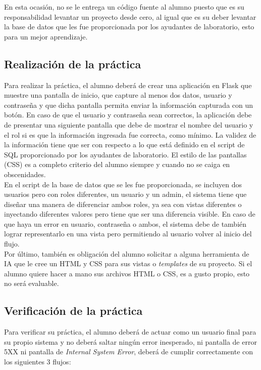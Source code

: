 \documentclass{article}
\begin{document}
En esta ocasión, no se le entrega un código fuente al alumno puesto que es su responsabilidad levantar un proyecto desde cero, al igual que es su deber levantar la base de datos que les fue proporcionada por los ayudantes de laboratorio, esto para un mejor aprendizaje.

\subsection{Realización de la práctica}

Para realizar la práctica, el alumno deberá de crear una aplicación en Flask que muestre una pantalla de inicio, que capture al menos dos datos, usuario y contraseña y que dicha pantalla permita enviar la información capturada con un botón. En caso de que el usuario y contraseña sean correctos, la aplicación debe de presentar una siguiente pantalla que debe de mostrar el nombre del usuario y el rol si es que la información ingresada fue correcta, como mínimo. La validez de la información tiene que ser con respecto a lo que está definido en el script de SQL proporcionado por los ayudantes de laboratorio. El estilo de las pantallas (CSS) es a completo criterio del alumno siempre y cuando no se caiga en obscenidades.\\

En el script de la base de datos que se les fue proporcionada, se incluyen dos usuarios pero con roles diferentes, un usuario y un admin, el sistema tiene que diseñar una manera de diferenciar ambos roles, ya sea con vistas diferentes o inyectando diferentes valores pero tiene que ser una diferencia visible. En caso de que haya un error en usuario, contraseña o ambos, el sistema debe de también lograr representarlo en una vista pero permitiendo al usuario volver al inicio del flujo.\\

Por último, también es obligación del alumno solicitar a alguna herramienta de IA que le cree un HTML y CSS para sus vistas o \textit{templates} de su proyecto. Si el alumno quiere hacer a mano sus archivos HTML o CSS, es a gusto propio, esto no será evaluable.\\
 
\subsection{Verificación de la práctica}

Para verificar su práctica, el alumno deberá de actuar como un usuario final para su propio sistema y no deberá saltar ningún error inesperado, ni pantalla de error 5XX ni pantalla de \textit{Internal System Error}, deberá de cumplir correctamente con los siguientes 3 flujos:
\end{document}
